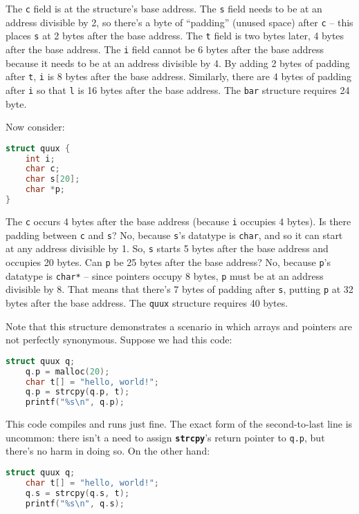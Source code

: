 \documentclass{article}
\newcommand{\function}[1]{\textbf{\lstinline{#1}}}
\begin{document}
The \lstinline{c} field is at the structure's base address.
The \lstinline{s} field needs to be at an address divisible by 2, so there's a byte of ``padding'' (unused space) after \lstinline{c} -- this places \lstinline{s} at 2 bytes after the base address.
The \lstinline{t} field is two bytes later, 4 bytes after the base address.
The \lstinline{i} field cannot be 6 bytes after the base address because it needs to be at an address divisible by 4.
By adding 2 bytes of padding after \lstinline{t}, \lstinline{i} is 8 bytes after the base address.
Similarly, there are 4 bytes of padding after \lstinline{i} so that \lstinline{l} is 16 bytes after the base address.
The \lstinline{bar} structure requires 24 byte.

Now consider:

\begin{lstlisting}[language=C]
struct quux {
    int i;
    char c;
    char s[20];
    char *p;
}
\end{lstlisting}

The \lstinline{c} occurs 4 bytes after the base address (because \lstinline{i} occupies 4 bytes).
Is there padding between \lstinline{c} and \lstinline{s}?
No, because \lstinline{s}'s datatype is \lstinline{char}, and so it can start at any address divisible by 1.
So, \lstinline{s} starts 5 bytes after the base address and occupies 20 bytes.
Can \lstinline{p} be 25 bytes after the base address?
No, because \lstinline{p}'s datatype is \lstinline{char*} -- since pointers occupy 8 bytes, \lstinline{p} must be at an address divisible by 8.
That means that there's 7 bytes of padding after \lstinline{s}, putting \lstinline{p} at 32 bytes after the base address.
The \lstinline{quux} structure requires 40 bytes.

Note that this structure demonstrates a scenario in which arrays and pointers are not perfectly synonymous.
Suppose we had this code:

\begin{lstlisting}[language=C]
    struct quux q;
    q.p = malloc(20);
    char t[] = "hello, world!";
    q.p = strcpy(q.p, t);
    printf("%s\n", q.p);
\end{lstlisting}

This code compiles and runs just fine.
The exact form of the second-to-last line is uncommon: there isn't a need to assign \function{strcpy}'s return pointer to \lstinline{q.p}, but there's no harm in doing so.
On the other hand:

\begin{lstlisting}[language=C]
    struct quux q;
    char t[] = "hello, world!";
    q.s = strcpy(q.s, t);
    printf("%s\n", q.s);
\end{lstlisting}
\end{document}
